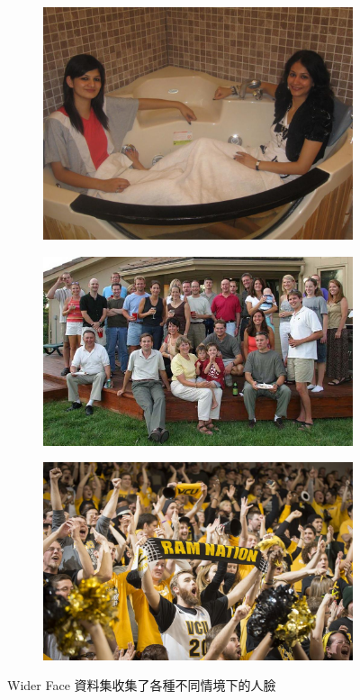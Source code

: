 \begin{figure}[t]
\begin{subfigure}[b]{0.3\textwidth}
\end{subfigure}
\begin{subfigure}[b]{0.3\textwidth}
    \includegraphics[width=\textwidth]{figures/wider_3}
\end{subfigure}
\begin{subfigure}[b]{0.3\textwidth}
    \includegraphics[width=\textwidth]{figures/wider_4}
\end{subfigure}
\begin{subfigure}[b]{0.3\textwidth}
    \includegraphics[width=\textwidth]{figures/same_original}
\end{subfigure}
\caption[Wider Face 資料集中的圖片範例]{Wider Face 資料集收集了各種不同情境下的人臉}
\label{fig:wider_face}
\end{figure}

